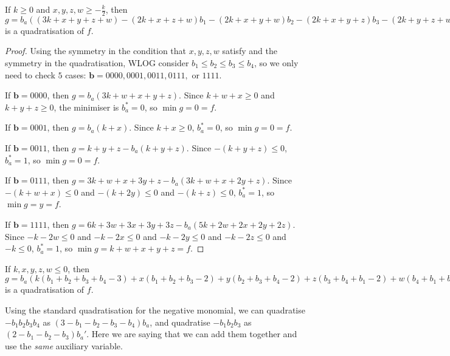 \documentclass[11pt]{scrartcl}
\newcommand{\vc}[1]{\boldsymbol{#1}}
\begin{document}
\begin{lemma}
	\label{allpositive}
	If $k \ge 0$ and $x, y, z, w \ge -\frac{k}{2}$, then $g = b_a((3k+x+y+z+w) - (2k+x+z+w)b_1 - (2k+x+y+w)b_2 - (2k+x+y+z)b_3 - (2k+y+z+w)b_4) + k(b_1b_2+b_1b_3+b_1 b_4+ b_2b_3+b_2b_4+b_3b_4) + x(b_1b_2+b_1b_3+b_2b_3) + y(b_2b_3+b_2b_4+b_3b_4) + z(b_1b_3+b_1b_4+b_3b_4) + w(b_1b_2+b_1b_4+b_2b_4)$ is a quadratisation of $f$.
\end{lemma}

\begin{proof}

Using the symmetry in the condition that $x, y, z, w$ satisfy and the symmetry in the quadratisation, WLOG consider $b_1\le b_2\le b_3\le b_4$, so we only need to check $5$ cases: $\vc b = 0000, 0001, 0011, 0111, $ or $1111$. 

If $\vc b = 0000$, then $g = b_a(3k + w + x + y + z)$. Since $k + w + x \ge 0$ and $k + y + z \ge 0$, the minimiser is $b_a^*= 0$, so $\min g = 0 = f$.

If $\vc b = 0001$, then $g = b_a(k + x)$. Since $k + x \ge 0$, $b_a^* = 0$, so $\min g = 0 = f$.

If $\vc b = 0011$, then $g = k + y + z - b_a(k + y + z)$. Since $-(k+y + z) \le 0$, $b_a^* = 1$, so $\min g = 0 = f$.

If $\vc b = 0111$, then $g = 3k + w + x + 3y + z - b_a(3k + w + x + 2y + z)$. Since $-(k+w+x) \le 0$ and $-(k+2y) \le 0$ and $-(k+z) \le 0$, $b_a^* = 1$, so $\min g = y = f$.

If $\vc b = 1111$, then $g = 6k + 3w + 3x + 3y + 3z - b_a(5k + 2w + 2x + 2y + 2z)$. Since $-k -2w \le 0$ and $-k - 2x \le 0$ and $-k -2y \le 0$ and $-k - 2z \le 0$ and $-k \le 0$, $b_a^* = 1$, so $\min g = k + w + x + y + z = f$.

\end{proof}

\begin{lemma}
	\label{allnegative}
	If $ k, x, y, z, w \le 0 $, then $g = b_a(k(b_1+b_2+b_3+b_4-3) + 
	x(b_1+b_2+b_3-2) + y(b_2+b_3+b_4-2) + z(b_3+b_4+b_1-2) + w(b_4+b_1+b_2-2))$ is a quadratisation of $f$.
\end{lemma}

\begin{remark}
	Using the standard quadratisation for the negative monomial, we can quadratise $ -b_1b_2b_3b_4 $ as $(3-b_1-b_2-b_3-b_4)b_a$, and quadratise
	$-b_1b_2b_3$ as $(2-b_1-b_2-b_3)b_a'$. Here we are saying that we can add them together and use the \textit{same} auxiliary variable.
\end{remark}
\end{document}

